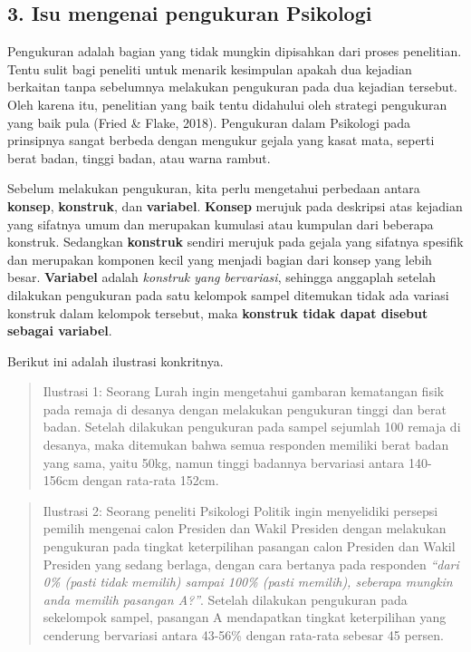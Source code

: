 \documentclass[
  english,
  man]{apa6}
\begin{document}
\hypertarget{isu-mengenai-pengukuran-psikologi}{%
\subsection{3. Isu mengenai pengukuran Psikologi}\label{isu-mengenai-pengukuran-psikologi}}

Pengukuran adalah bagian yang tidak mungkin dipisahkan dari proses penelitian. Tentu sulit bagi peneliti untuk menarik kesimpulan apakah dua kejadian berkaitan tanpa sebelumnya melakukan pengukuran pada dua kejadian tersebut. Oleh karena itu, penelitian yang baik tentu didahului oleh strategi pengukuran yang baik pula (Fried \& Flake, 2018). Pengukuran dalam Psikologi pada prinsipnya sangat berbeda dengan mengukur gejala yang kasat mata, seperti berat badan, tinggi badan, atau warna rambut.

Sebelum melakukan pengukuran, kita perlu mengetahui perbedaan antara \textbf{konsep}, \textbf{konstruk}, dan \textbf{variabel}. \textbf{Konsep} merujuk pada deskripsi atas kejadian yang sifatnya umum dan merupakan kumulasi atau kumpulan dari beberapa konstruk. Sedangkan \textbf{konstruk} sendiri merujuk pada gejala yang sifatnya spesifik dan merupakan komponen kecil yang menjadi bagian dari konsep yang lebih besar. \textbf{Variabel} adalah \emph{konstruk yang bervariasi}, sehingga anggaplah setelah dilakukan pengukuran pada satu kelompok sampel ditemukan tidak ada variasi konstruk dalam kelompok tersebut, maka \textbf{konstruk tidak dapat disebut sebagai variabel}.

Berikut ini adalah ilustrasi konkritnya.

\begin{quote}
Ilustrasi 1: Seorang Lurah ingin mengetahui gambaran kematangan fisik pada remaja di desanya dengan melakukan pengukuran tinggi dan berat badan. Setelah dilakukan pengukuran pada sampel sejumlah 100 remaja di desanya, maka ditemukan bahwa semua responden memiliki berat badan yang sama, yaitu 50kg, namun tinggi badannya bervariasi antara 140-156cm dengan rata-rata 152cm.
\end{quote}

\begin{quote}
Ilustrasi 2: Seorang peneliti Psikologi Politik ingin menyelidiki persepsi pemilih mengenai calon Presiden dan Wakil Presiden dengan melakukan pengukuran pada tingkat keterpilihan pasangan calon Presiden dan Wakil Presiden yang sedang berlaga, dengan cara bertanya pada responden \emph{\enquote{dari 0\% (pasti tidak memilih) sampai 100\% (pasti memilih), seberapa mungkin anda memilih pasangan A?}}. Setelah dilakukan pengukuran pada sekelompok sampel, pasangan A mendapatkan tingkat keterpilihan yang cenderung bervariasi antara 43-56\% dengan rata-rata sebesar 45 persen.
\end{quote}
\end{document}
